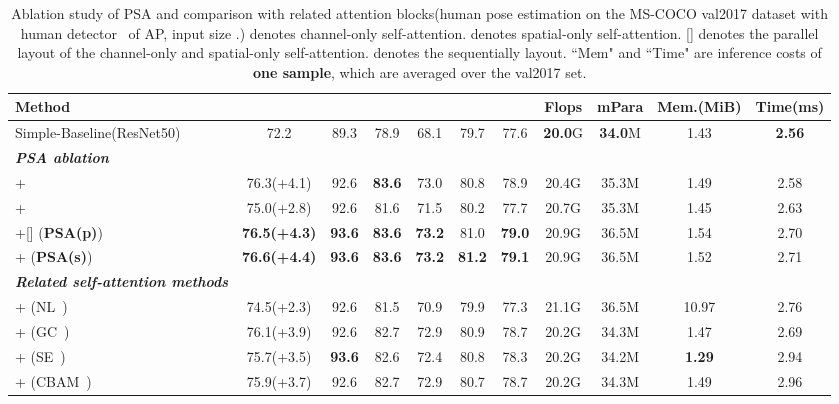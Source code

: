 \documentclass[10pt,twocolumn,letterpaper]{article}
\begin{document}
\begin{table*}[!htb]
\centering
\fontsize{7}{8}\selectfont
\setlength{\tabcolsep}{1.6pt}
\begin{tabular}{l||cccccc|c|c|c|c|}
\hline
Method       &      &  &  &   &   &   & Flops  & mPara  & Mem.(MiB) & Time(ms)\\ \hline \hline
Simple-Baseline(ResNet50)~\cite{Xiao18} &72.2 &89.3 &78.9 &68.1 &79.7 &77.6 &\textbf{20.0}G&\textbf{34.0}M& 1.43 & \textbf{2.56}\\
\hline
\textbf{\textit{PSA ablation}}    &     &   &   &   &   &    & & & &\\
+    &  76.3(+4.1) & 92.6 & \textbf{83.6} & 73.0 & 80.8 & 78.9   &20.4G &35.3M &  1.49  & 2.58 \\
+    &  75.0(+2.8) & 92.6 & 81.6 & 71.5 & 80.2 & 77.7   &20.7G &35.3M& 1.45 & 2.63  \\
+[] (\textbf{PSA(p)})  & \textbf{76.5(+4.3)} & \textbf{93.6} & \textbf{83.6} & \textbf{73.2} & 81.0 &  \textbf{79.0}  &20.9G &36.5M & 1.54 & 2.70 \\
+  (\textbf{PSA(s)})  & \textbf{76.6}\textbf{(+4.4)} & \textbf{93.6} & \textbf{83.6} & \textbf{73.2} & \textbf{81.2} & \textbf{79.1}   &20.9G &36.5M & 1.52 & 2.71 \\
\hline
\textbf{\textit{Related self-attention methods}}    &     &   &   &   &   &    & & && \\
 + (NL~\cite{Wang18nonlocal}) &  74.5(+2.3) & 92.6 & 81.5 & 70.9 & 79.9 & 77.3   & 21.1G & 36.5M& 10.97 & 2.76 \\
+ (GC~\cite{Cao19})    &  76.1(+3.9) & 92.6 & 82.7 & 72.9 & 80.9 &  78.7  &20.2G &34.3M & 1.47 & 2.69\\
 + (SE~\cite{Hu18})    &  75.7(+3.5) & \textbf{93.6} & 82.6 & 72.4 & 80.8 & 78.3   &20.2G &34.2M & \textbf{1.29} & 2.94 \\
 + (CBAM~\cite{Sanghyun2018cbam})   & 75.9(+3.7) & 92.6 & 82.7 & 72.9 & 80.7 &  78.7  & 20.2G & 34.3M& 1.49 & 2.96\\ 
  
\hline
\end{tabular}
\caption{Ablation study of PSA and comparison with related attention blocks(human pose estimation on the MS-COCO val2017 dataset with human detector~\cite{Xiao18} of AP, input size .)  denotes channel-only self-attention.  denotes spatial-only self-attention. [] denotes the parallel layout of the channel-only and spatial-only self-attention.  denotes the sequentially layout. ``Mem" and ``Time" are inference costs of \textbf{one sample}, which are averaged over the val2017 set.}
\label{table:Ablation}
\end{table*}
\end{document}

